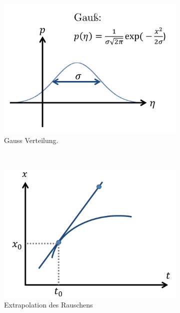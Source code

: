 \documentclass[12pt]{article}
\begin{document}
\begin{figure}[h] 
		\begin{subfigure}[h]{0.5 \textwidth}
		\centering
		\includegraphics[width=\textwidth]{Folie76.png}
		\caption{Gauss Verteilung.} 
		\label{fig:whatever1}
		\centering
	\end{subfigure}
	~
\begin{subfigure}[h]{0.5\textwidth}
		\centering
		\includegraphics[width=\textwidth]{Folie77.png}
		\caption{Extrapolation des Rauschens}
		\label{fig:Extrapolation}
		\centering
	\end{subfigure}
	\caption{}
\end{figure}	
\end{document}

